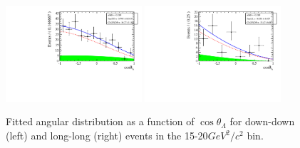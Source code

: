 \begin{figure}[h]
\centering
\includegraphics[width=0.45\textwidth]{Lmumu/figs/AngularDistribs/Fitted/AfbB_DD_q2_1500_2000.pdf}
\includegraphics[width=0.45\textwidth]{Lmumu/figs/AngularDistribs/Fitted/AfbB_LL_q2_1500_2000.pdf}
\caption{Fitted angular distribution as a function of $\cos\theta_\Lambda$ for down-down (left) and long-long (right) events in the 15-20$GeV^2/c^2$ \qsq bin.  }
\label{fig:AngFitB}
\end{figure}




